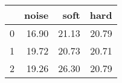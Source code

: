 \begin{tabular}{lrrr}
\toprule
{} &  noise &   soft &   hard \\
\midrule
0 &  16.90 &  21.13 &  20.79 \\
1 &  19.72 &  20.73 &  20.71 \\
2 &  19.26 &  26.30 &  20.79 \\
\bottomrule
\end{tabular}
